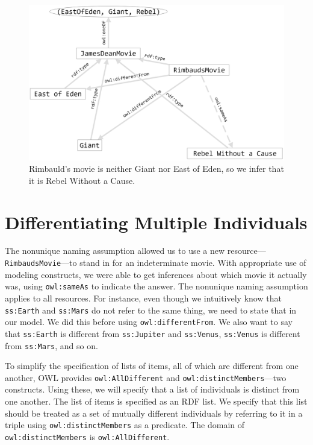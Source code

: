 \begin{figure}
\centering
\includegraphics[width=5in]{SWWOv3/media/ch13/figure13-1.png}
\caption{Rimbauld's movie is neither Giant nor East of Eden, so we infer that it
is Rebel Without a Cause.}
\label{fig:ch13.01}
\end{figure}



\section{Differentiating Multiple Individuals}

The nonunique naming assumption allowed us to use a new
resource---\texttt{RimbaudsMovie}---to stand in for an indeterminate movie. With
appropriate use of modeling constructs, we were able to get inferences
about which movie it actually was, using \texttt{owl:sameAs} to indicate the
answer. The nonunique naming assumption applies to all resources. For
instance, even though we intuitively know that \texttt{ss:Earth} and \texttt{ss:Mars} do
not refer to the same thing, we need to state that in our model. We did
this before using \texttt{owl:differentFrom}. We also want to say that \texttt{ss:Earth}
is different from \texttt{ss:Jupiter} and \texttt{ss:Venus}, \texttt{ss:Venus} is different from
\texttt{ss:Mars}, and so on.

To simplify the specification of lists of items, all of which are
different from one another, OWL provides \texttt{owl:AllDifferent} and
\texttt{owl:distinctMembers}---two constructs. Using these, we will specify that
a list of individuals is distinct from one another. The list of items is
specified as an RDF list. We specify that this list should be treated as
a set of mutually different individuals by referring to it in a triple
using \texttt{owl:distinctMembers} as a predicate. The domain of
\texttt{owl:distinctMembers} is \texttt{owl:AllDifferent}.

